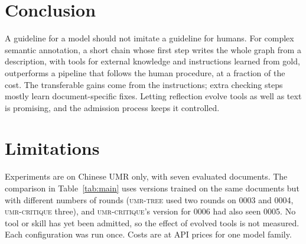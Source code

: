\documentclass[11pt]{article}
\newcommand{\umr}{\textsc{UMR}\xspace}
\newcommand{\sys}{\textsc{umr-critique}\xspace}
\newcommand{\tree}{\textsc{umr-tree}\xspace}
\begin{document}
\section{Conclusion}

A guideline for a model should not imitate a guideline for humans. For complex semantic annotation, a short chain whose first step writes the whole graph from a description, with tools for external knowledge and instructions learned from gold, outperforms a pipeline that follows the human procedure, at a fraction of the cost. The transferable gains come from the instructions; extra checking steps mostly learn document-specific fixes. Letting reflection evolve tools as well as text is promising, and the admission process keeps it controlled.

\section*{Limitations}

Experiments are on Chinese \umr only, with seven evaluated documents. The comparison in Table~\ref{tab:main} uses versions trained on the same documents but with different numbers of rounds (\tree used two rounds on 0003 and 0004, \sys three), and \sys's version for 0006 had also seen 0005. No tool or skill has yet been admitted, so the effect of evolved tools is not measured. Each configuration was run once. Costs are at API prices for one model family.


\end{document}
